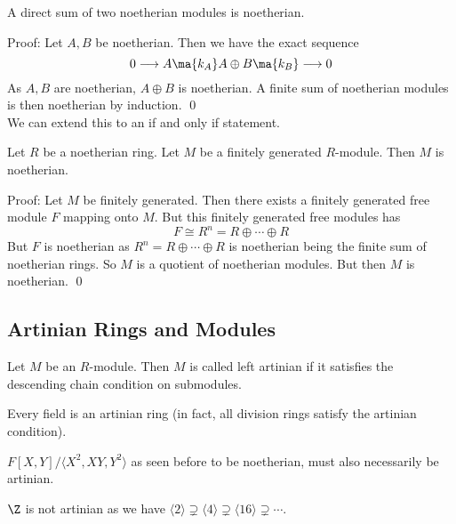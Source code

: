\begin{prop}
A direct sum of two noetherian modules is noetherian.
\end{prop}

Proof: Let $A,B$ be noetherian. Then we have the exact sequence
\[
0 \longrightarrow A \ma{k_A} A \oplus B \ma{k_B} \longrightarrow 0
\]
As $A,B$ are noetherian, $A \oplus B$ is noetherian. A finite sum of noetherian modules is then noetherian by induction. \qed \\

We can extend this to an if and only if statement. 

\begin{prop}
Let $R$ be a noetherian ring. Let $M$ be a finitely generated $R$-module. Then $M$ is noetherian. 
\end{prop}

Proof: Let $M$ be finitely generated. Then there exists a finitely generated free module $F$ mapping onto $M$. But this finitely generated free modules has
\[
F \cong R^n=R \oplus \cdots \oplus R
\]
But $F$ is noetherian as $R^n=R \oplus \cdots \oplus R$ is noetherian being the finite sum of noetherian rings. So $M$ is a quotient of noetherian modules. But then $M$ is noetherian. \qed \\

\subsection{Artinian Rings and Modules}

\begin{dfn}
Let $M$ be an $R$-module. Then $M$ is called left artinian if it satisfies the descending chain condition on submodules.
\end{dfn}

\begin{ex}
Every field is an artinian ring (in fact, all division rings satisfy the artinian condition).
\end{ex}

\begin{ex}
$F[X,Y]/\langle X^2,XY,Y^2\rangle$ as seen before to be noetherian, must also necessarily be artinian.
\end{ex}

\begin{ex}
$\Z$ is not artinian as we have $\langle 2 \rangle \supsetneq \langle 4 \rangle \supsetneq \langle 16 \rangle \supsetneq \cdots$. 
\end{ex}

